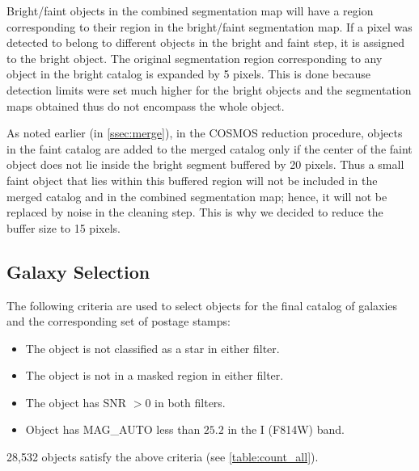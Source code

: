 \documentclass[a4paper,11pt]{article}
\begin{document}
Bright/faint objects in the combined segmentation map will have a region corresponding to their region in the bright/faint segmentation map. If a pixel was detected to belong to different objects in the bright and faint step, it is assigned to the bright object. The original segmentation region corresponding to any object in the bright catalog is expanded by 5 pixels. This is done because detection limits were set much higher for the bright objects and the segmentation maps obtained thus do not encompass the whole object. 

As noted earlier (in \autoref{ssec:merge}), in the COSMOS reduction procedure, objects in the faint catalog are added to the merged catalog only if the center of the faint object does not lie inside the bright segment buffered by 20 pixels. Thus a small faint object that lies within this buffered region will not be included in the merged catalog and in the combined segmentation map; hence, it will not be replaced by noise in the cleaning step. This is why we decided to reduce the buffer size to 15 pixels. 

\subsection{Galaxy Selection}
\label{sec:gal_selection}
The following criteria are used to  select objects for the final catalog of galaxies and the corresponding set of postage stamps:
\begin{itemize}
\item The object is not classified as a star in either filter.
\item The object is not in a masked region in either filter.
\item The object has SNR $>0$ in both filters.
\item Object has MAG\_AUTO less than $25.2$ in the I (F814W) band. 
\end{itemize}

28,532 objects satisfy the above criteria (see \autoref{table:count_all}).
\end{document}

